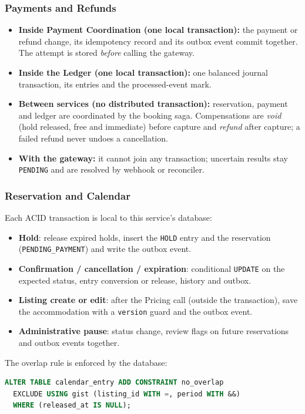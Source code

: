 \subsubsection{Payments and Refunds}
\label{sec:pay-boundaries}

\begin{itemize}
  \item \textbf{Inside Payment Coordination (one local transaction):} the
    payment or refund change, its idempotency record and its outbox event
    commit together. The attempt is stored \emph{before} calling the gateway.
  \item \textbf{Inside the Ledger (one local transaction):} one balanced
    journal transaction, its entries and the processed-event mark.
  \item \textbf{Between services (no distributed transaction):} reservation,
    payment and ledger are coordinated by the booking saga. Compensations are
    \emph{void} (hold released, free and immediate) before capture and
    \emph{refund} after capture; a failed refund never undoes a cancellation.
  \item \textbf{With the gateway:} it cannot join any transaction; uncertain
    results stay \texttt{PENDING} and are resolved by webhook or reconciler.
\end{itemize}

\subsubsection{Reservation and Calendar}
Each ACID transaction is local to this service's database:
\begin{itemize}
  \item \textbf{Hold}: release expired holds, insert the \texttt{HOLD} entry and
    the reservation (\texttt{PENDING\_PAYMENT}) and write the outbox event.
  \item \textbf{Confirmation / cancellation / expiration}: conditional
    \texttt{UPDATE} on the expected status, entry conversion or release,
    history and outbox.
  \item \textbf{Listing create or edit}: after the Pricing call (outside the
    transaction), save the accommodation with a \texttt{version} guard and the
    outbox event.
  \item \textbf{Administrative pause}: status change, review flags on future
    reservations and outbox events together.
\end{itemize}
The overlap rule is enforced by the database:
\begin{lstlisting}[language=SQL, basicstyle=\ttfamily\footnotesize, frame=single]
ALTER TABLE calendar_entry ADD CONSTRAINT no_overlap
  EXCLUDE USING gist (listing_id WITH =, period WITH &&)
  WHERE (released_at IS NULL);
\end{lstlisting}

